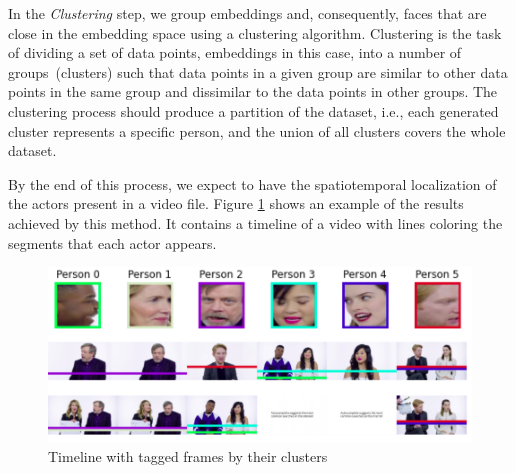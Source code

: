 In the \textit{Clustering} step, we group embeddings and, consequently, faces that are close in the embedding space using a clustering algorithm. 
%
Clustering is the task of dividing a set of data points, embeddings in this case, into a number of groups~(clusters) such that data points in a given group are similar to other data points in the same group and dissimilar to the data points in other groups.
The clustering process should produce a partition of the dataset, i.e., each generated cluster represents a specific person, and the union of all clusters covers the whole dataset.

By the end of this process, we expect to have the spatiotemporal localization of the actors present in a video file.
Figure \ref{fig:timeline} shows an example of the results achieved by this method. It contains a timeline of a video with lines coloring the segments that each actor appears.

\begin{figure}[!ht]
    \centering
    \includegraphics[width=0.6\linewidth]{img/face_clustering/timeline2.png}
    \caption{Timeline with tagged frames by their clusters}
    \label{fig:timeline}
\end{figure}

